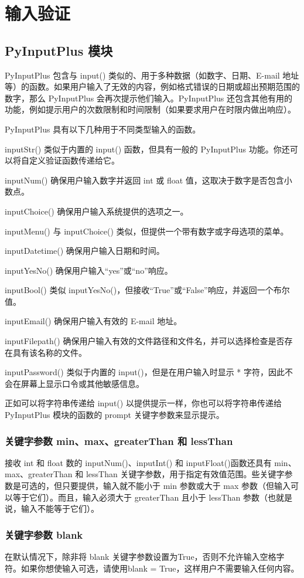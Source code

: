 \chapter{输入验证\label{ch08}}
\section{PyInputPlus 模块}
PyInputPlus 包含与 input() 类似的、用于多种数据（如数字、日期、E-mail 地址等）的函数。如果用户输入了无效的内容，例如格式错误的日期或超出预期范围的数字，那么 PyInputPlus 会再次提示他们输入。PyInputPlus 还包含其他有用的功能，例如提示用户的次数限制和时间限制（如果要求用户在时限内做出响应）。

PyInputPlus 具有以下几种用于不同类型输入的函数。

inputStr() 类似于内置的 input() 函数，但具有一般的 PyInputPlus 功能。你还可以将自定义验证函数传递给它。

inputNum() 确保用户输入数字并返回 int 或 float 值，这取决于数字是否包含小数点。

inputChoice() 确保用户输入系统提供的选项之一。

inputMenu() 与 inputChoice() 类似，但提供一个带有数字或字母选项的菜单。

inputDatetime() 确保用户输入日期和时间。

inputYesNo() 确保用户输入“yes”或“no”响应。

inputBool() 类似 inputYesNo()，但接收“True”或“False”响应，并返回一个布尔值。

inputEmail() 确保用户输入有效的 E-mail 地址。

inputFilepath() 确保用户输入有效的文件路径和文件名，并可以选择检查是否存在具有该名称的文件。

inputPassword() 类似于内置的 input()，但是在用户输入时显示 * 字符，因此不会在屏幕上显示口令或其他敏感信息。

正如可以将字符串传递给 input() 以提供提示一样，你也可以将字符串传递给 PyInputPlus 模块的函数的 prompt 关键字参数来显示提示。
\subsection{关键字参数 min、max、greaterThan 和 lessThan}
接收 int 和 float 数的 inputNum()、inputInt() 和 inputFloat()函数还具有 min、max、greaterThan 和 lessThan 关键字参数，用于指定有效值范围。些关键字参数是可选的，但只要提供，输入就不能小于 min 参数或大于 max 参数（但输入可以等于它们）。而且，输入必须大于 greaterThan 且小于 lessThan 参数（也就是说，输入不能等于它们）。
\subsection{关键字参数 blank}
在默认情况下，除非将 blank 关键字参数设置为True，否则不允许输入空格字符。如果你想使输入可选，请使用blank = True，这样用户不需要输入任何内容。
